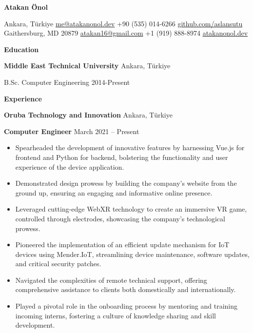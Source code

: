 \documentclass[11pt]{article}
\begin{document}
\begin{center}
    \textbf{Atakan Önol}\\ 
    \hrulefill
\end{center}

\begin{center}
    Ankara, Türkiye \textbullet \href{mailto:me@atakanonol.dev}{me@atakanonol.dev} \textbullet +90 (535) 014-6266 \textbullet \href{https://github.com/aslansutu}{github.com/aslansutu} \\
    Gaithersburg, MD 20879 \textbullet \href{mailto:atakan16@gmail.com}{atakan16@gmail.com} \textbullet +1 (919) 888-8974 \textbullet \href{https://atakanonol.dev}{atakanonol.dev} \\
\end{center}

\vspace{0.5pt}

\begin{center}
    \textbf{Education}
\end{center}
\textbf{Middle East Technical University} \hfill Ankara, Türkiye

B.Sc. Computer Engineering \hfill 2014-Present

\vspace{12pt}

\begin{center}
    \textbf{Experience}
\end{center}
\textbf{Oruba Technology and Innovation} \hfill Ankara, Türkiye

\textbf{Computer Engineer} \hfill March 2021 – Present
\begin{itemize}[noitemsep, topsep=0pt, partopsep=0pt, parsep=0pt]
    \item Spearheaded the development of innovative features by harnessing Vue.js for frontend and Python for backend, bolstering the functionality and user experience of the device application.
    \item Demonstrated design prowess by building the company’s website from the ground up, ensuring an engaging and informative online presence.
    \item Leveraged cutting-edge WebXR technology to create an immersive VR game, controlled through electrodes, showcasing the company’s technological prowess.
    \item Pioneered the implementation of an efficient update mechanism for IoT devices using Mender.IoT, streamlining device maintenance, software updates, and critical security patches.
    \item Navigated the complexities of remote technical support, offering comprehensive assistance to clients both domestically and internationally.
    \item Played a pivotal role in the onboarding process by mentoring and training incoming interns, fostering a culture of knowledge sharing and skill development.
\end{itemize}
\end{document}
